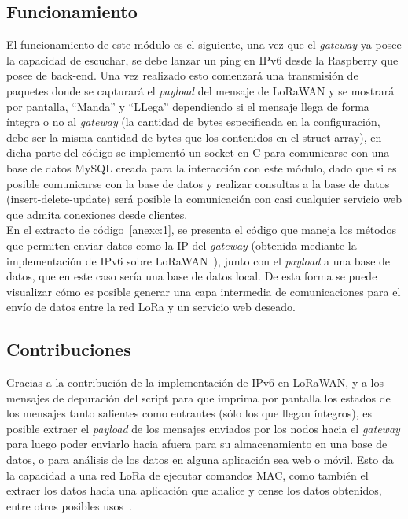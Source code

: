 \begin{justify}
\subsection{Funcionamiento}
El funcionamiento de este módulo es el siguiente, una vez que el \textit{gateway} ya posee la capacidad de escuchar, se debe lanzar un ping en IPv6 desde la Raspberry que posee de back-end. Una vez realizado esto comenzará una transmisión de paquetes donde se capturará el \textit{payload} del mensaje de LoRaWAN y se mostrará por pantalla,  ``Manda'' y ``LLega'' dependiendo si el mensaje llega de forma íntegra o no al \textit{gateway} (la cantidad de bytes especificada en la configuración, debe ser la misma cantidad de bytes que los contenidos en el struct array), en dicha parte del código se implementó un \gls{socket} en C para comunicarse con una base de datos MySQL creada para la interacción con este módulo, dado que si es posible comunicarse con la base de datos y realizar consultas a la base de datos (insert-delete-update) será posible la comunicación con casi cualquier servicio web que admita conexiones desde clientes.\\
En el extracto de código~\ref{anexc:1}, se presenta el código que maneja los métodos que permiten enviar datos como la IP del \textit{gateway} (obtenida mediante la implementación de IPv6 sobre LoRaWAN~\cite{tomas}), junto con el \textit{payload} a una base de datos, que en este caso sería una base de datos local. De esta forma se puede visualizar cómo es posible generar una capa intermedia de comunicaciones para el envío de datos entre la red LoRa y un servicio web deseado.
\subsection{Contribuciones}
Gracias a la contribución de la implementación de IPv6 en LoRaWAN, y a los mensajes de depuración del script para que imprima por pantalla los estados de los mensajes tanto salientes como entrantes (sólo los que llegan íntegros), es posible extraer el \textit{payload} de los mensajes enviados por los nodos hacia el \textit{gateway} para luego poder enviarlo hacia afuera para su almacenamiento en una base de datos, o para análisis de los datos en alguna aplicación sea web o móvil. Esto da la capacidad a una red LoRa de ejecutar comandos MAC, como también el extraer los datos hacia una aplicación que analice y cense los datos obtenidos, entre otros posibles usos~\cite{tomas}.

\end{justify}
